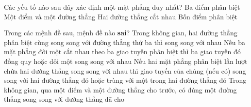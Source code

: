 \begin{ex}%
	Các yếu tố nào sau đây xác định một mặt phẳng duy nhất?
	\choice
	{Ba điểm phân biệt}
	{Một điểm và một đường thẳng}
	{\True Hai đường thẳng cắt nhau}
	{Bốn điểm phân biệt}
\end{ex}

\begin{ex}%
	Trong các mệnh đề sau, mệnh đề nào \textbf{sai}?
	\choice
	{Trong không gian, hai đường thẳng phân biệt cùng song song với đường thẳng thứ ba thì song song với nhau}
	{Nếu ba mặt phẳng đôi một cắt nhau theo ba giao tuyến phân biệt thì ba giao tuyến đó đồng quy hoặc dôi một song song với nhau}
	{Nếu hai mặt phẳng phân biệt lần lượt chứa hai đường thẳng song song với nhau thì giao tuyến của chúng (nếu có) song song với hai đường thẳng đó hoặc trùng với một trong hai đường thẳng đó}
	{\True Trong không gian, qua một điểm và một đường thẳng cho trước, có đúng một đường thẳng song song với đường thẳng đã cho}
\end{ex}

